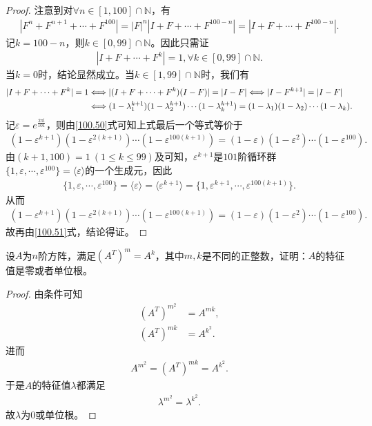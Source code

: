\documentclass[../../main.tex]{subfiles}
\begin{document}
\begin{proof}
注意到对$\forall n\in [1,100]\cap \mathbb{N}$，有
\begin{align*}
|F^n + F^{n + 1} + \cdots + F^{100}| = |F|^n|I + F + \cdots + F^{100 - n}| = |I + F + \cdots + F^{100 - n}|.
\end{align*}
记$k = 100 - n$，则$k\in [0,99]\cap \mathbb{N}$。因此只需证
\begin{align*}
|I + F + \cdots + F^k| = 1,\forall k\in [0,99]\cap \mathbb{N}.
\end{align*}
当$k = 0$时，结论显然成立。当$k\in [1,99]\cap \mathbb{N}$时，我们有
\begin{align}
|I + F + \cdots + F^k| = 1 &\Longleftrightarrow |(I + F + \cdots + F^k)(I - F)| = |I - F| \Longleftrightarrow |I - F^{k + 1}| = |I - F| \notag \\
&\Longleftrightarrow (1 - \lambda_1^{k + 1})(1 - \lambda_2^{k + 1})\cdots (1 - \lambda_k^{k + 1}) = (1 - \lambda_1)(1 - \lambda_2)\cdots (1 - \lambda_k). \label{100.51}
\end{align}
记$\varepsilon = e^{\frac{2\pi \mathrm{i}}{101}}$，则由\eqref{100.50}式可知上式最后一个等式等价于
\begin{align*}
(1 - \varepsilon^{k + 1})(1 - \varepsilon^{2(k + 1)})\cdots (1 - \varepsilon^{100(k + 1)}) = (1 - \varepsilon)(1 - \varepsilon^2)\cdots (1 - \varepsilon^{100}).
\end{align*}
由$(k + 1,100) = 1\ (1\leqslant k\leqslant 99)$及可知，$\varepsilon^{k + 1}$是$101$阶循环群$\{1,\varepsilon,\cdots,\varepsilon^{100}\} = \langle \varepsilon \rangle$的一个生成元，因此
\begin{align*}
\{1,\varepsilon,\cdots,\varepsilon^{100}\} = \langle \varepsilon \rangle = \langle \varepsilon^{k + 1} \rangle = \{1,\varepsilon^{k + 1},\cdots,\varepsilon^{100(k + 1)}\}.
\end{align*}
从而
\begin{align*}
(1 - \varepsilon^{k + 1})(1 - \varepsilon^{2(k + 1)})\cdots (1 - \varepsilon^{100(k + 1)}) = (1 - \varepsilon)(1 - \varepsilon^2)\cdots (1 - \varepsilon^{100}).
\end{align*}
故再由\eqref{100.51}式，结论得证。 
\end{proof}

\begin{example}
设$A$为$n$阶方阵，满足$(A^T)^m = A^k$，其中$m,k$是不同的正整数，证明：$A$的特征值是零或者单位根。 
\end{example}
\begin{proof}
由条件可知
\begin{align*}
(A^T)^{m^2}&=A^{mk},\\
(A^T)^{mk}&=A^{k^2}.
\end{align*}
进而
\begin{align*}
A^{m^2}=(A^T)^{mk}=A^{k^2}.
\end{align*}
于是$A$的特征值$\lambda$都满足
\begin{align*}
\lambda^{m^2}=\lambda^{k^2}.
\end{align*}
故$\lambda$为$0$或单位根。 
\end{proof}
\end{document}
